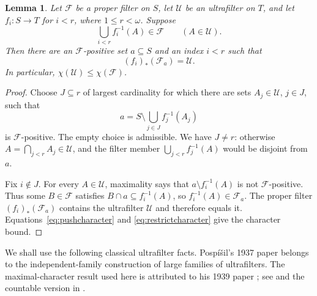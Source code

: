 \documentclass[10pt,a4paper]{amsart}
\newtheorem{lemma}[theorem]{Lemma}
\theoremstyle{definition}
\theoremstyle{remark}
\newcommand{\U}{\mathcal U}
\newcommand{\F}{\mathcal F}
\begin{document}
\begin{lemma}\label{lem:finite}
Let $\F$ be a proper filter on $S$, let $\U$ be an ultrafilter on $T$, and let $f_i:S\to T$ for $i<r$, where $1\leqslant r<\omega$. Suppose
\begin{equation}\label{eq:finiteunion}
\bigcup_{i<r}f_i^{-1}(A)\in\F\qquad(A\in\U).
\end{equation}
Then there are an $\F$-positive set $a\subseteq S$ and an index $i<r$ such that
\[
(f_i)_*(\F_a)=\U.
\]
In particular, $\chi(\U)\leqslant\chi(\F)$.
\end{lemma}
\begin{proof}
Choose $J\subseteq r$ of largest cardinality for which there are sets $A_j\in\U$, $j\in J$, such that
\[
a=S\setminus\bigcup_{j\in J}f_j^{-1}(A_j)
\]
is $\F$-positive. The empty choice is admissible. We have $J\ne r$: otherwise $A=\bigcap_{j<r}A_j\in\U$, and the filter member $\bigcup_{j<r}f_j^{-1}(A)$ would be disjoint from $a$.

Fix $i\notin J$. For every $A\in\U$, maximality says that $a\setminus f_i^{-1}(A)$ is not $\F$-positive. Thus some $B\in\F$ satisfies $B\cap a\subseteq f_i^{-1}(A)$, so $f_i^{-1}(A)\in\F_a$. The proper filter $(f_i)_*(\F_a)$ contains the ultrafilter $\U$ and therefore equals it. Equations~\eqref{eq:pushcharacter} and \eqref{eq:restrictcharacter} give the character bound.
\end{proof}

We shall use the following classical ultrafilter facts. Posp\'i\v{s}il's 1937 paper \cite{Pospisil1937} belongs to the independent-family construction of large families of ultrafilters. The maximal-character result used here is attributed to his 1939 paper \cite{Pospisil1939}; see \cite[Theorem 2.7]{Comfort} and the countable version in \cite{GuzmanHrusak}.
\end{document}
